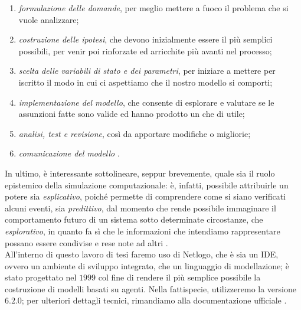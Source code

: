 \begin{enumerate}
\item \textit{formulazione delle domande}, per meglio mettere a fuoco il problema che si vuole analizzare;
\item \textit{costruzione delle ipotesi}, che devono inizialmente essere il più semplici possibili, per venir poi rinforzate ed arricchite più avanti nel processo;
\item \textit{scelta delle variabili di stato e dei parametri}, per iniziare a mettere per iscritto il modo in cui ci aspettiamo che il nostro modello si comporti;
\item \textit{implementazione del modello}, che consente di esplorare e valutare se le assunzioni fatte sono valide ed hanno prodotto un che di utile;
\item \textit{analisi, test e revisione}, così da apportare modifiche o migliorie;
\item \textit{comunicazione del modello} \cite{Grimm}.
\end{enumerate}
In ultimo, è interessante sottolineare, seppur brevemente, quale sia il ruolo epistemico della simulazione computazionale: è, infatti, possibile attribuirle un potere sia \emph{esplicativo}, poiché permette di comprendere come si siano verificati alcuni eventi, sia \emph{predittivo}, dal momento che rende possibile immaginare il comportamento futuro di un sistema sotto determinate circostanze, che \emph{esplorativo}, in quanto fa sì che le informazioni che intendiamo rappresentare possano essere condivise e rese note ad altri \cite{Primiero}.
\\ All'interno di questo lavoro di tesi faremo uso di Netlogo, che è sia un IDE, ovvero un ambiente di sviluppo integrato, che un linguaggio di modellazione; è stato progettato nel $ 1999 $ col fine di rendere il più semplice possibile la costruzione di modelli basati su agenti. Nella fattispecie, utilizzeremo la versione $ 6.2.0 $; per ulteriori dettagli tecnici, rimandiamo alla documentazione ufficiale \cite{Wilensky}.